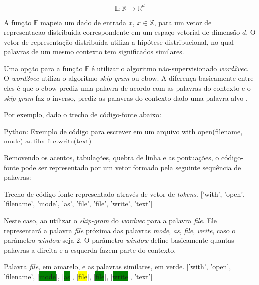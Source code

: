 \begin{equation}
    \mathbb{E}: \mathbb{X} \rightarrow \mathbb{R}^{d}
\end{equation}

A função $\mathbb{E}$ mapeia um dado de entrada $x$, $x \in \mathbb{X}$, para um vetor de \gls{representacao-distribuida} correspondente em um espaço vetorial de dimensão $d$. O vetor de representação distribuída utiliza a hipótese distribucional, no qual palavras de um mesmo contexto tem significados similares.

Uma opção para a função $\mathbb{E}$ é utilizar o algoritmo não-supervisionado \textit{word2vec}. O \textit{word2vec} utiliza o algoritmo \textit{skip-gram} ou \acrshort{cbow}. A diferença basicamente entre eles é que o \acrshort{cbow} prediz uma palavra de acordo com as palavras do contexto e o \textit{skip-gram} faz o inverso, prediz as palavras do contexto dado uma palavra alvo \citep{mikolov2013distributed}.

Por exemplo, dado o trecho de código-fonte abaixo:

\begin{mypython}{Python: Exemplo de código para escrever em um arquivo}
with open(filename, mode) as file:
    file.write(text)
\end{mypython}

Removendo os acentos, tabulações, quebra de linha e as pontuações, o código-fonte pode ser representado por um vetor formado pela seguinte sequência de palavras:

\begin{mypythonembedding}{Trecho de código-fonte representado através de vetor de \textit{tokens}.}
  ['with', 'open', 'filename', 'mode', 'as', 'file', 'file', 'write', 'text']
\end{mypythonembedding}

Neste caso, ao utilizar o \textit{skip-gram} do \textit{wordvec} para a palavra \emph{file}. Ele representará a palavra \emph{file} próxima das palavras \emph{mode}, \emph{as}, \emph{file}, \emph{write}, caso o parâmetro \textit{window} seja $2$. O parâmetro \textit{window} define basicamente quantas palavras a direita e a esquerda fazem parte do contexto.

\begin{mypythonembedding}{Palavra \textit{file}, em amarelo, e as palavras similares, em verde.}
  ['with', 'open', 'filename', |\colorbox{green}{mode}|, |\colorbox{green}{as}|, |\colorbox{yellow}{file}|, |\colorbox{green}{file}|, |\colorbox{green}{write}|, 'text']
\end{mypythonembedding}

